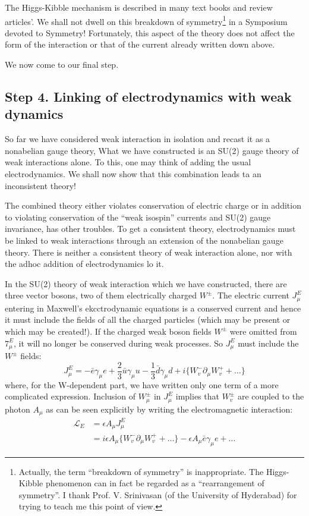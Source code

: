 The Higgs-Kibble mechanism is described in many text books and review articles’. We shall not
dwell on this breakdown of symmetry\footnote{Actually, the term “breakdown of symmetry” is inappropriate. The Higgs-Kibble phenomenon can in fact be regarded as a “rearrangement of symmetry”. I thank Prof. V. Srinivasan (of the University of Hyderabad) for trying to teach me this
point of view.} in a Symposium devoted to Symmetry! Fortunately, this
aspect of the theory does not affect the form of the interaction or that of the current already
written down above. 

We now come to our final step. 

\subsection*{Step 4. Linking of electrodynamics with weak dynamics}

So far we have considered weak interaction in isolation and recast it as a nonabelian gauge theory,
What we have constructed is an SU(2) gauge theory of weak interactions alone. To this, one may
think of adding the usual electrodynamics. We shall now show that this combination leads ta an
inconsistent theory! 

The combined theory either violates conservation of electric charge or in addition to violating
conservation of the “weak isospin” currents and SU(2) gauge invariance, has other troubles. To
get a consistent theory, electrodynamics must be linked to weak interactions through an extension
of the nonabelian gauge theory. There is neither a consistent theory of weak interaction alone, nor
with the adhoc addition of electrodynamics lo it. 

In the SU(2) theory of weak interaction which we have constructed, there are three vector bosons,
two of them electrically charged $W^{\pm}$. The electric current $J^{E}_{\mu}$ entering in Maxwell's ekcctrodynamic
equations is a conserved current and hence it must include the fields of all the charged particles
(which may be present or which may be created!). If the charged weak boson fields $W^{\pm}$ were
omitted from $7^{E}_{\mu}$, it will no longer be conserved during weak processes. So $J^{E}_{\mu}$ must include the $W^{\pm}$ fields: 
\begin{equation*}
J^{E}_{\mu} = -\bar{e}\gamma_{\mu}e + \frac{2}{3} \bar{u}\gamma_{\mu}u - \frac{1}{3}\bar{d}\gamma_{\mu}d + i \{W^{-}_{v}\partial_{\mu} W^{+}_{v}+ \ldots \}\tag{3.22}
\end{equation*}
where, for the W-dependent part, we have written only one term of a more complicated expression.
Inclusion of $W^{\pm}_{\mu}$ in $J^{E}_{\mu}$ implies that $W^{\pm}_{v}$ are coupled to the photon $A_{\mu}$ as can be seen explicitly by
writing the electromagnetic interaction: 
\begin{align*}
\mathcal{L}_{E}&= \epsilon A_{\mu}J^{E}_{\mu}\\
& = i \epsilon A_{\mu} \{W^{-}_{v}\partial_{\mu} W^{+}_{v} + \ldots\}-\epsilon A_{\mu}\bar{e}\gamma_{\mu}e + \ldots\tag{3.23}
\end{align*}

